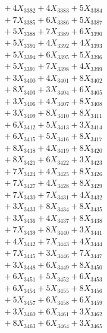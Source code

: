 \documentclass[a4paper,10pt]{article}
\begin{document}
{\begin{align}
&\;  + 4 X_{3382} + 4 X_{3383} + 5 X_{3384} \\[0.3ex]
&\;  + 7 X_{3385} + 6 X_{3386} + 5 X_{3387} \\[0.3ex]
&\;  + 5 X_{3388} + 7 X_{3389} + 6 X_{3390} \\[0.3ex]
&\;  + 5 X_{3391} + 4 X_{3392} + 4 X_{3393} \\[0.3ex]
&\;  + 5 X_{3394} + 6 X_{3395} + 5 X_{3396} \\[0.3ex]
&\;  + 5 X_{3397} + 7 X_{3398} + 4 X_{3399} \\[0.5ex]\allowbreak
&\;  + 3 X_{3400} + 4 X_{3401} + 8 X_{3402} \\[0.3ex]
&\;  + 8 X_{3403} + 3 X_{3404} + 6 X_{3405} \\[0.3ex]
&\;  + 3 X_{3406} + 4 X_{3407} + 8 X_{3408} \\[0.3ex]
&\;  + 3 X_{3409} + 8 X_{3410} + 8 X_{3411} \\[0.3ex]
&\;  + 6 X_{3412} + 5 X_{3413} + 3 X_{3414} \\[0.3ex]
&\;  + 6 X_{3415} + 5 X_{3416} + 8 X_{3417} \\[0.3ex]
&\;  + 8 X_{3418} + 4 X_{3419} + 8 X_{3420} \\[0.3ex]
&\;  + 8 X_{3421} + 6 X_{3422} + 3 X_{3423} \\[0.3ex]
&\;  + 7 X_{3424} + 4 X_{3425} + 8 X_{3426} \\[0.3ex]
&\;  + 7 X_{3427} + 4 X_{3428} + 8 X_{3429} \\[0.5ex]\allowbreak
&\;  + 7 X_{3430} + 7 X_{3431} + 4 X_{3432} \\[0.3ex]
&\;  + 3 X_{3433} + 8 X_{3434} + 8 X_{3435} \\[0.3ex]
&\;  + 3 X_{3436} + 4 X_{3437} + 8 X_{3438} \\[0.3ex]
&\;  + 7 X_{3439} + 8 X_{3440} + 3 X_{3441} \\[0.3ex]
&\;  + 4 X_{3442} + 7 X_{3443} + 4 X_{3444} \\[0.3ex]
&\;  + 7 X_{3445} + 3 X_{3446} + 7 X_{3447} \\[0.3ex]
&\;  + 3 X_{3448} + 6 X_{3449} + 8 X_{3450} \\[0.3ex]
&\;  + 6 X_{3451} + 5 X_{3452} + 6 X_{3453} \\[0.3ex]
&\;  + 6 X_{3454} + 5 X_{3455} + 8 X_{3456} \\[0.3ex]
&\;  + 5 X_{3457} + 6 X_{3458} + 6 X_{3459} \\[0.5ex]\allowbreak
&\;  + 3 X_{3460} + 6 X_{3461} + 3 X_{3462} \\[0.3ex]
&\;  + 8 X_{3463} + 6 X_{3464} + 3 X_{3465} \\[0.3ex]

\end{align}}
\end{document}

